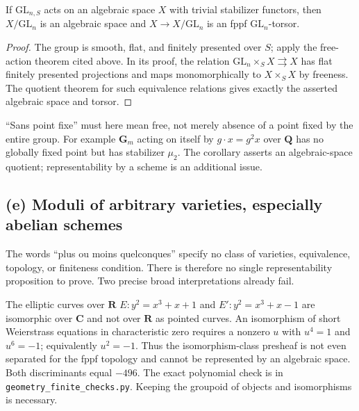 \begin{corollary}
\label{geo-Kd}
If $\mathrm{GL}_{n,S}$ acts on an algebraic space $X$ with trivial
stabilizer functors, then $X/\mathrm{GL}_n$ is an algebraic space and
$X\to X/\mathrm{GL}_n$ is an fppf $\mathrm{GL}_n$-torsor.
\end{corollary}
\begin{proof}
The group is smooth, flat, and finitely presented over $S$; apply the
free-action theorem cited above. In its proof, the relation
$\mathrm{GL}_n\times_S X\rightrightarrows X$ has flat finitely presented
projections and maps monomorphically to $X\times_S X$ by freeness. The
quotient theorem for such equivalence relations gives exactly the asserted
algebraic space and torsor.
\end{proof}

``Sans point fixe'' must here mean free, not merely absence of a point
fixed by the entire group. For example $\mathbf G_m$ acting on itself by
$g\cdot x=g^2x$ over $\mathbf Q$ has no globally fixed point but has
stabilizer $\mu_2$. The corollary asserts an algebraic-space quotient;
representability by a scheme is an additional issue.

\subsection{(e) Moduli of arbitrary varieties, especially abelian schemes}

The words ``plus ou moins quelconques'' specify no class of varieties,
equivalence, topology, or finiteness condition. There is therefore no single
representability proposition to prove. Two precise broad interpretations
already fail.

\begin{example}
\label{geo-Ke-twist}
The elliptic curves over $\mathbf R$
$E:y^2=x^3+x+1$ and $E':y^2=x^3+x-1$ are isomorphic over $\mathbf C$
and not over $\mathbf R$ as pointed curves. An isomorphism of short
Weierstrass equations in characteristic zero requires a nonzero $u$ with
$u^4=1$ and $u^6=-1$; equivalently $u^2=-1$. Thus the isomorphism-class
presheaf is not even separated for the fppf topology and cannot be
represented by an algebraic space. Both discriminants equal $-496$.
The exact polynomial check is in \texttt{geometry\_finite\_checks.py}.
Keeping the groupoid of objects and isomorphisms is necessary.
\end{example}

